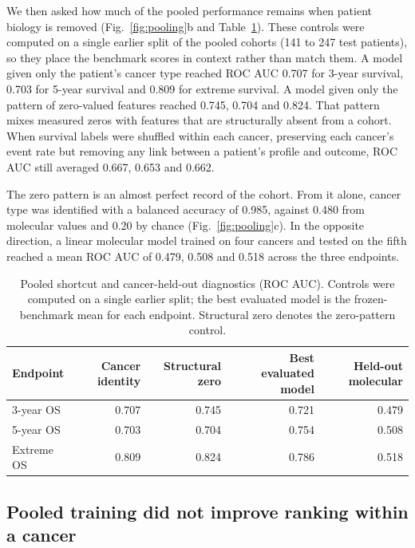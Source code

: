 \documentclass[pdflatex,sn-nature]{sn-jnl}
\begin{document}
We then asked how much of the pooled performance remains when patient biology is removed (Fig.~\ref{fig:pooling}b and Table~\ref{tab:shortcuts}). These controls were computed on a single earlier split of the pooled cohorts (141 to 247 test patients), so they place the benchmark scores in context rather than match them. A model given only the patient's cancer type reached ROC AUC 0.707 for 3-year survival, 0.703 for 5-year survival and 0.809 for extreme survival. A model given only the pattern of zero-valued features reached 0.745, 0.704 and 0.824. That pattern mixes measured zeros with features that are structurally absent from a cohort. When survival labels were shuffled within each cancer, preserving each cancer's event rate but removing any link between a patient's profile and outcome, ROC AUC still averaged 0.667, 0.653 and 0.662.

The zero pattern is an almost perfect record of the cohort. From it alone, cancer type was identified with a balanced accuracy of 0.985, against 0.480 from molecular values and 0.20 by chance (Fig.~\ref{fig:pooling}c). In the opposite direction, a linear molecular model trained on four cancers and tested on the fifth reached a mean ROC AUC of 0.479, 0.508 and 0.518 across the three endpoints.



\begin{table}[ht]
\centering
\caption{Pooled shortcut and cancer-held-out diagnostics (ROC AUC). Controls were computed on a single earlier split; the best evaluated model is the frozen-benchmark mean for each endpoint. Structural zero denotes the zero-pattern control.}
\label{tab:shortcuts}
\footnotesize\setlength{\tabcolsep}{3pt}\begin{tabular}{lrrrr}
\toprule
Endpoint & Cancer identity & Structural zero & Best evaluated model & Held-out molecular \\
\midrule
3-year OS & 0.707 & 0.745 & 0.721 & 0.479 \\
5-year OS & 0.703 & 0.704 & 0.754 & 0.508 \\
Extreme OS & 0.809 & 0.824 & 0.786 & 0.518 \\
\bottomrule
\end{tabular}

\end{table}

\subsection*{Pooled training did not improve ranking within a cancer}
\end{document}
